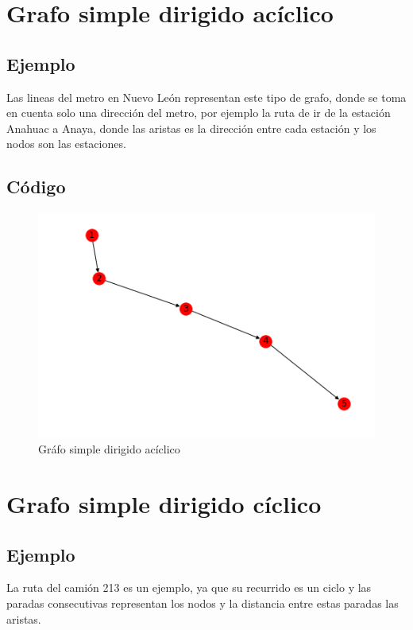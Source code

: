 \documentclass[10pt,a4paper]{article}
\begin{document}
\section{Grafo simple  dirigido acíclico}
\subsection{Ejemplo}Las lineas del metro en Nuevo León representan este tipo de grafo, donde se toma en cuenta solo una dirección del metro, por ejemplo la ruta de ir de la estación Anahuac a  Anaya, donde las aristas es la dirección entre cada estación y los nodos son las estaciones. 
\subsection{Código}
\begin{figure}[H]
\centering
\includegraphics[scale=.5]{grafosimpledirigidoaciclico}
\caption{Gráfo simple dirigido acíclico}
\end{figure}

\section{Grafo simple  dirigido cíclico}
\subsection{Ejemplo} La ruta del camión 213 es un ejemplo, ya que su recurrido es un ciclo y las paradas consecutivas representan los nodos y la distancia entre estas paradas las aristas. 
\end{document}
